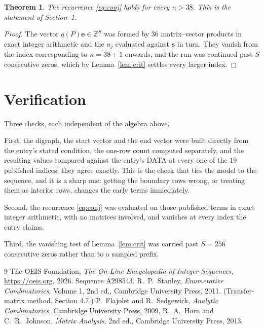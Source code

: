 \documentclass[11pt,a4paper]{article}
\theoremstyle{plain}
\newtheorem{theorem}{Theorem}
\theoremstyle{definition}
\begin{document}
\begin{theorem}
The recurrence \eqref{eq:conj} holds for every $n>38$. This is the statement of
Section~1.
\end{theorem}

\begin{proof}
The vector $q(P)\mathbf{e}\in\mathbb{Z}^{S}$ was formed by $36$ matrix--vector
products in exact integer arithmetic and the $u_j$ evaluated against $\mathbf{s}$ in turn.
They vanish from the index corresponding to $n=38+1$ onwards, and the run was continued
past $S$ consecutive zeros, which by Lemma~\ref{lem:crit} settles every larger index.
\end{proof}

\section{Verification}

Three checks, each independent of the algebra above.

First, the digraph, the start vector and the end vector were built directly from the
entry's stated condition, the one-row count computed separately, and the resulting values
compared against the entry's DATA at every one of the $19$ published indices; they
agree exactly. This is the check that ties the model to the sequence, and it is a sharp one:
getting the boundary rows wrong, or treating them as interior rows, changes the early terms
immediately.

Second, the recurrence \eqref{eq:conj} was evaluated on those published terms in exact
integer arithmetic, with no matrices involved, and vanishes at every index the entry claims.

Third, the vanishing test of Lemma~\ref{lem:crit} was carried past $S=256$ consecutive
zeros rather than to a sampled prefix.

\begin{thebibliography}{9}
 The OEIS Foundation, \emph{The On-Line Encyclopedia of Integer
Sequences}, \url{https://oeis.org}, 2026. Sequence A298543.
 R.~P.~Stanley, \emph{Enumerative Combinatorics}, Volume 1, 2nd ed.,
Cambridge University Press, 2011. (Transfer-matrix method, Section 4.7.)
 P.~Flajolet and R.~Sedgewick, \emph{Analytic Combinatorics}, Cambridge
University Press, 2009.
 R.~A.~Horn and C.~R.~Johnson, \emph{Matrix Analysis}, 2nd ed., Cambridge
University Press, 2013.
\end{thebibliography}
\end{document}
